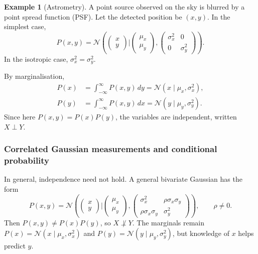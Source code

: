 \documentclass[11pt, titlepage]{article} %
\numberwithin{equation}{section}
\theoremstyle{definition}
\newtheorem*{example*}{Example}
\numberwithin{assumption}{section}
\begin{document}
\begin{example*}[Astrometry]
A point source observed on the sky is blurred by a point spread function (PSF). Let the detected position be $(x,y)$. In the simplest case,
\begin{equation*}
    P(x,y)=\mathcal{N}\!\left(
    \begin{pmatrix}x\\y\end{pmatrix}
    \Bigg|
    \begin{pmatrix}\mu_x\\ \mu_y\end{pmatrix},
    \begin{pmatrix}\sigma_x^2 & 0\\ 0 & \sigma_y^2\end{pmatrix}
    \right).
\end{equation*}
In the isotropic case, $\sigma_x^2=\sigma_y^2$.

By marginalisation,
\begin{align*}
    P(x)&=\int_{-\infty}^{\infty}P(x,y)\,dy=\mathcal{N}(x\mid \mu_x,\sigma_x^2),\\
    P(y)&=\int_{-\infty}^{\infty}P(x,y)\,dx=\mathcal{N}(y\mid \mu_y,\sigma_y^2).
\end{align*}
Since here $P(x,y)=P(x)P(y)$, the variables are independent, written $X\perp Y$.
\end{example*}

\subsubsection*{Correlated Gaussian measurements and conditional probability}

In general, independence need not hold. A general bivariate Gaussian has the form
\begin{equation*}
    P(x,y)=
    \mathcal{N}\!\left(
    \begin{pmatrix}x\\y\end{pmatrix}
    \Bigg|
    \begin{pmatrix}\mu_x\\ \mu_y\end{pmatrix},
    \begin{pmatrix}
        \sigma_x^2 & \rho \sigma_x\sigma_y\\
        \rho \sigma_x\sigma_y & \sigma_y^2
    \end{pmatrix}
    \right),
    \qquad \rho\ne 0.
\end{equation*}
Then $P(x,y)\ne P(x)P(y)$, so $X\not\perp Y$. The marginals remain $P(x)=\mathcal{N}(x\mid \mu_x,\sigma_x^2)$ and $P(y)=\mathcal{N}(y\mid \mu_y,\sigma_y^2)$, but knowledge of $x$ helps predict $y$.
\end{document}

